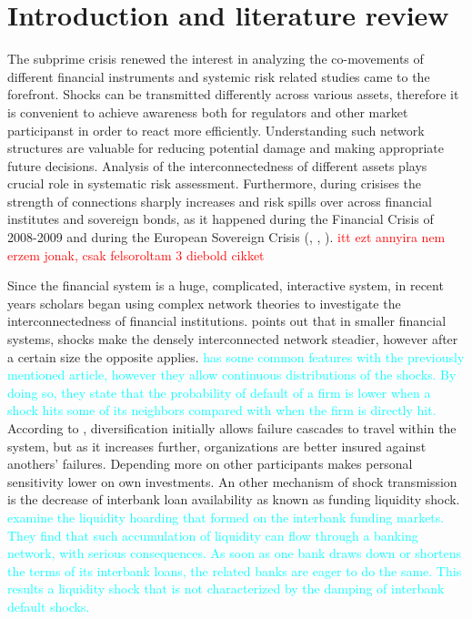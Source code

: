 \documentclass[12pt,bibliography=totoc]{article}
\begin{document}
\newpage

\section{Introduction and literature review}

The subprime crisis renewed the interest in analyzing the co-movements of different financial instruments and systemic risk related studies came to the forefront. Shocks can be transmitted differently across various assets, therefore it is convenient to achieve awareness both for regulators and other market participanst in order to react more efficiently. Understanding such network structures are valuable for reducing potential damage and making appropriate future decisions. Analysis of the interconnectedness of different assets plays crucial role in systematic risk assessment. Furthermore, during crisises the strength of connections sharply increases and risk spills over across financial institutes and sovereign bonds, as it happened during the Financial Crisis of 2008-2009 and during the European Sovereign Crisis (\cite{diebold2012better}, \cite{diebold2014network}, \cite{demirer2018estimating}). \textcolor{red}{itt ezt annyira nem erzem jonak, csak felsoroltam 3 diebold cikket}

Since the financial system is a huge, complicated, interactive system, in recent years scholars began using complex network theories to investigate the interconnectedness of financial institutions. \cite{acemoglu2015systemic} points out that in smaller financial systems, shocks make the densely interconnected network steadier, however after a certain size the opposite applies. \textcolor{cyan}{\cite{glasserman2015likely} has some common features with the previously mentioned article, however they allow continuous distributions of the shocks. By doing so, they state that the probability of default of a firm is lower when a shock hits some of its neighbors compared with when the firm is directly hit.} According to \cite{elliott2014financial}, diversification initially allows failure cascades to travel within the system, but as it increases further, organizations are better insured against anothers' failures. Depending more on other participants makes personal sensitivity lower on own investments. An other mechanism of shock transmission is the decrease of interbank loan availability as known as funding liquidity shock. \textcolor{cyan}{\cite{gai2010contagion} examine the liquidity hoarding that formed on the interbank funding markets. They find that such accumulation of liquidity can flow through a banking network, with serious consequences. As soon as one bank draws down or shortens the terms of its interbank loans, the related banks are eager to do the same. This results a liquidity shock that is not characterized by the damping of interbank default shocks.}
\end{document}
